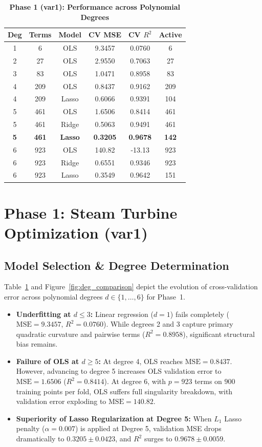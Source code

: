 \documentclass[10pt,twocolumn]{article}
\begin{document}
\begin{table}[h]
\centering
\small
\caption{\textbf{Phase 1 (var1): Performance across Polynomial Degrees}}
\label{tab:var1_perf}
\begin{tabular}{cccccc}
\toprule
\textbf{Deg} & \textbf{Terms} & \textbf{Model} & \textbf{CV MSE} & \textbf{CV $R^2$} & \textbf{Active} \\
\midrule
1 & 6 & OLS & 9.3457 & 0.0760 & 6 \\
2 & 27 & OLS & 2.9550 & 0.7063 & 27 \\
3 & 83 & OLS & 1.0471 & 0.8958 & 83 \\
4 & 209 & OLS & 0.8437 & 0.9162 & 209 \\
4 & 209 & Lasso & 0.6066 & 0.9391 & 104 \\
5 & 461 & OLS & 1.6506 & 0.8414 & 461 \\
5 & 461 & Ridge & 0.5063 & 0.9491 & 461 \\
\textbf{5} & \textbf{461} & \textbf{Lasso} & \textbf{0.3205} & \textbf{0.9678} & \textbf{142} \\
6 & 923 & OLS & 140.82 & -13.13 & 923 \\
6 & 923 & Ridge & 0.6551 & 0.9346 & 923 \\
6 & 923 & Lasso & 0.3549 & 0.9642 & 151 \\
\bottomrule
\end{tabular}
\end{table}

\section{Phase 1: Steam Turbine Optimization (var1)}

\subsection{Model Selection \& Degree Determination}
Table~\ref{tab:var1_perf} and Figure~\ref{fig:deg_comparison} depict the evolution of cross-validation error across polynomial degrees $d \in \{1, \dots, 6\}$ for Phase~1.
\begin{itemize}\setlength{\itemsep}{1pt}
    \item \textbf{Underfitting at $d \le 3$:} Linear regression ($d=1$) fails completely ($\text{MSE}=9.3457$, $R^2=0.0760$). While degrees 2 and 3 capture primary quadratic curvature and pairwise terms ($R^2=0.8958$), significant structural bias remains.
    \item \textbf{Failure of OLS at $d \ge 5$:} At degree 4, OLS reaches $\text{MSE}=0.8437$. However, advancing to degree 5 increases OLS validation error to $\text{MSE}=1.6506$ ($R^2=0.8414$). At degree 6, with $p=923$ terms on $900$ training points per fold, OLS suffers full singularity breakdown, with validation error exploding to $\text{MSE}=140.82$.
    \item \textbf{Superiority of Lasso Regularization at Degree 5:} When $L_1$ Lasso penalty ($\alpha = 0.007$) is applied at Degree 5, validation MSE drops dramatically to $\mathbf{0.3205 \pm 0.0423}$, and $R^2$ surges to $\mathbf{0.9678 \pm 0.0059}$.
\end{itemize}
\end{document}
